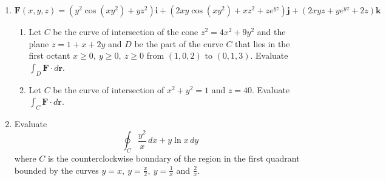 \documentclass[a4paper, 12pt]{article}
\renewcommand{\headrulewidth}{0pt}
\begin{document}
\begin{enumerate}[leftmargin=*,label=\textbf{\arabic*.}]
\newpage

\item $\mathbf{F}(x,y,z)=\left(y^2\cos\left(xy^2\right)+yz^2\right)\mathbf{i}+\left(2xy\cos\left(xy^2\right)+xz^2+z{e}^{yz}\right)\mathbf{j}+\left(2xyz+y{e}^{yz}+2z\right)\mathbf{k}$

\begin{enumerate}[leftmargin=*,label=\textbf{\alph*.}]
\item Let $C $ be the curve of intersection of the cone $z^2=4x^2+9y^2$ and the plane $z=1+x+2y$ and $D$ be the part of the curve $C$ that lies in the first octant $x\geq0,\:y\geq0,\:z\geq0$ from $(1,0,2)$ to $(0,1,3)$. Evaluate $\int_D\mathbf{F}\cdot d\mathbf{r}$.

\item Let $C$ be the curve of intersection of $x^2+y^2=1$ and $z=40$. Evaluate $\int_C\mathbf{F}\cdot d\mathbf{r}$.
\end{enumerate}

\item Evaluate
\[\oint_C\frac{y^2}x\,dx+y\ln x\,dy\]
where $C$ is the counterclockwise boundary of the region in the first quadrant bounded by the curves $y=x,\:y=\frac x2,\:y=\frac1x$ and $\frac2x$.
\end{enumerate}

\newpage
\pagestyle{fancy}
\renewcommand{\headrulewidth}{1pt}

\end{document}
